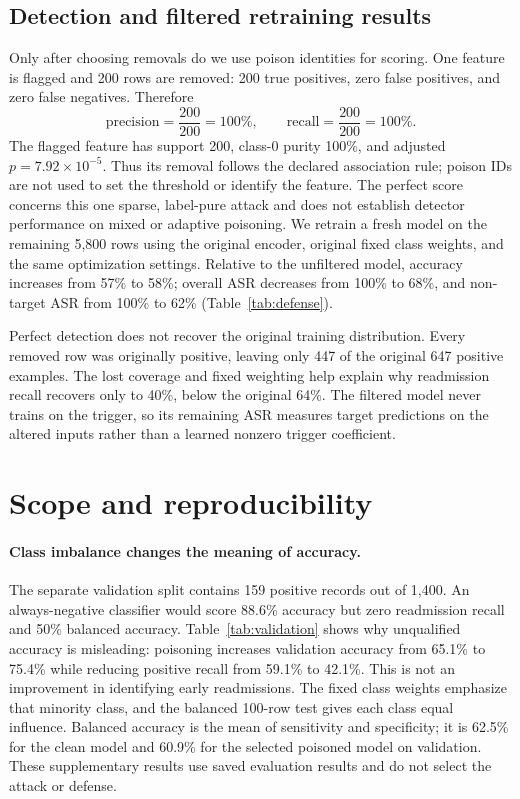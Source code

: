 \documentclass[letterpaper,twocolumn,10pt]{article}
\begin{document}
\subsection{Detection and filtered retraining results}
Only after choosing removals do we use poison identities for scoring. One feature is flagged and 200 rows are removed: 200 true positives, zero false positives, and zero false negatives. Therefore
\[
\mathrm{precision}=\frac{200}{200}=100\%,\qquad
\mathrm{recall}=\frac{200}{200}=100\%.
\]
The flagged feature has support 200, class-0 purity 100\%, and adjusted $p=7.92\times10^{-5}$. Thus its removal follows the declared association rule; poison IDs are not used to set the threshold or identify the feature. The perfect score concerns this one sparse, label-pure attack and does not establish detector performance on mixed or adaptive poisoning.
We retrain a fresh model on the remaining 5,800 rows using the original encoder, original fixed class weights, and the same optimization settings. Relative to the unfiltered model, accuracy increases from 57\% to 58\%; overall ASR decreases from 100\% to 68\%, and non-target ASR from 100\% to 62\% (Table~\ref{tab:defense}).

Perfect detection does not recover the original training distribution. Every removed row was originally positive, leaving only 447 of the original 647 positive examples. The lost coverage and fixed weighting help explain why readmission recall recovers only to 40\%, below the original 64\%. The filtered model never trains on the trigger, so its remaining ASR measures target predictions on the altered inputs rather than a learned nonzero trigger coefficient.

\section{Scope and reproducibility}
\paragraph{Class imbalance changes the meaning of accuracy.}
The separate validation split contains 159 positive records out of 1,400. An always-negative classifier would score 88.6\% accuracy but zero readmission recall and 50\% balanced accuracy. Table~\ref{tab:validation} shows why unqualified accuracy is misleading: poisoning increases validation accuracy from 65.1\% to 75.4\% while reducing positive recall from 59.1\% to 42.1\%. This is not an improvement in identifying early readmissions. The fixed class weights emphasize that minority class, and the balanced 100-row test gives each class equal influence. Balanced accuracy is the mean of sensitivity and specificity; it is 62.5\% for the clean model and 60.9\% for the selected poisoned model on validation. These supplementary results use saved evaluation results and do not select the attack or defense.
\end{document}
